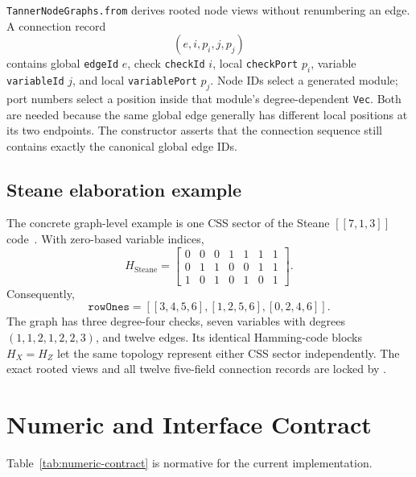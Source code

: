 \documentclass[10pt,conference]{IEEEtran}
\begin{document}
\texttt{TannerNodeGraphs.from} derives rooted node views without renumbering an
edge.  A connection record
\begin{equation}
 (e,i,p_i,j,p_j)
\end{equation}
contains global \texttt{edgeId} $e$, check \texttt{checkId} $i$, local
\texttt{checkPort} $p_i$, variable \texttt{variableId} $j$, and local
\texttt{variablePort} $p_j$.  Node IDs select a generated module; port numbers
select a position inside that module's degree-dependent \texttt{Vec}.  Both are
needed because the same global edge generally has different local positions at
its two endpoints.  The constructor asserts that the connection sequence still
contains exactly the canonical global edge IDs.

\subsection{Steane elaboration example}
The concrete graph-level example is one CSS sector of the Steane
$[[7,1,3]]$ code~\cite{steane1996}.  With zero-based variable indices,
\begin{equation}
 H_{\mathrm{Steane}} =
 \begin{bmatrix}
 0&0&0&1&1&1&1\\
 0&1&1&0&0&1&1\\
 1&0&1&0&1&0&1
 \end{bmatrix}.
\end{equation}
Consequently,
\begin{equation}
 \texttt{rowOnes}=
 [[3,4,5,6],[1,2,5,6],[0,2,4,6]].
\end{equation}
The graph has three degree-four checks, seven variables with degrees
$(1,1,2,1,2,2,3)$, and twelve edges.  Its identical Hamming-code blocks
$H_X=H_Z$ let the same topology represent either CSS sector independently.
The exact rooted views and all twelve five-field connection records are locked
by .

\section{Numeric and Interface Contract}
Table~\ref{tab:numeric-contract} is normative for the current implementation.
\end{document}
